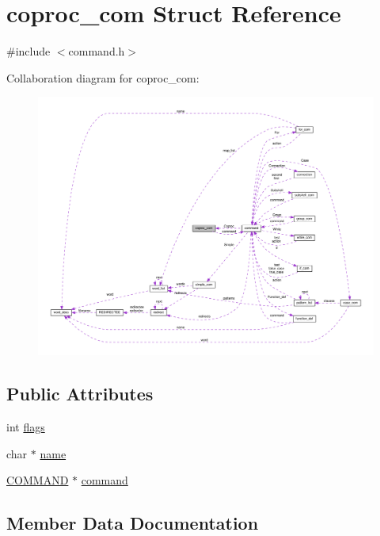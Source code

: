 \hypertarget{structcoproc__com}{}\section{coproc\+\_\+com Struct Reference}
\label{structcoproc__com}


{\ttfamily \#include $<$command.\+h$>$}



Collaboration diagram for coproc\+\_\+com\+:
\nopagebreak
\begin{figure}[H]
\begin{center}
\leavevmode
\includegraphics[width=350pt]{structcoproc__com__coll__graph}
\end{center}
\end{figure}
\subsection*{Public Attributes}
\begin{DoxyCompactItemize}
\item 
int \hyperlink{structcoproc__com_a01d4593beb818d1f8b158b482194ad61}{flags}
\item 
char $\ast$ \hyperlink{structcoproc__com_a6d076457d5bc4a12617e68939a1f7afa}{name}
\item 
\hyperlink{command_8h_a8c41dec142c299806885773c902c0d87}{C\+O\+M\+M\+A\+ND} $\ast$ \hyperlink{structcoproc__com_a22bba3feba2226cd96700bbc5502766f}{command}
\end{DoxyCompactItemize}


\subsection{Member Data Documentation}
